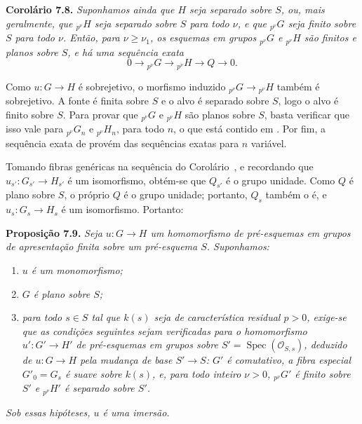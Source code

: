 \medskip
\noindent{}\textbf{Corolário 7.8.}
\textit{Suponhamos ainda que \(H\) seja separado sobre \(S\), ou, mais
geralmente, que \({}_{p^\nu}H\) seja separado sobre \(S\) para todo \(\nu\),
e que \({}_{p^\nu}G\) seja finito sobre \(S\) para todo \(\nu\). Então,
para \(\nu\geq\nu_1\), os esquemas em grupos \({}_{p^\nu}G\) e
\({}_{p^\nu}H\) são finitos e planos sobre \(S\), e há uma sequência
exata}
\[
  0\longrightarrow{}_{p^\nu}G
  \longrightarrow{}_{p^\nu}H
  \longrightarrow Q
  \longrightarrow0.
\]

Como \(u:G\to H\) é sobrejetivo, o morfismo induzido
\({}_{p^\nu}G\to{}_{p^\nu}H\) também é sobrejetivo. A fonte é finita
sobre \(S\) e o alvo é separado sobre \(S\), logo o alvo é
finito sobre \(S\). Para provar que \({}_{p^\nu}G\) e \({}_{p^\nu}H\) são
planos sobre \(S\), basta verificar que isso vale para
\({}_{p^\nu}G_n\) e \({}_{p^\nu}H_n\), para todo \(n\), o que está
contido em . Por fim, a sequência
exata de 
provém das sequências exatas  para
\(n\) variável.

Tomando fibras genéricas na sequência do
Corolário~, e recordando que
\(u_{s'}:G_{s'}\to H_{s'}\) é um isomorfismo, obtém-se que \(Q_{s'}\)
é o grupo unidade. Como \(Q\) é plano sobre \(S\), o próprio \(Q\) é o
grupo unidade; portanto, \(Q_s\) também o é, e \(u_s:G_s\to H_s\) é um
isomorfismo. Portanto:

\medskip
\noindent{}\textbf{Proposição 7.9.}
\textit{Seja \(u:G\to H\) um homomorfismo de pré-esquemas em grupos de
apresentação finita sobre um pré-esquema \(S\). Suponhamos:}
\begin{enumerate}
  \item[(a)]
  \textit{\(u\) é um monomorfismo;}
  \item[(b)]
  \textit{\(G\) é plano sobre \(S\);}
  \item[(c)]
  \textit{para todo \(s\in S\) tal que \(k(s)\) seja de característica
  residual \(p>0\), exige-se que as condições seguintes sejam verificadas
  para o homomorfismo \(u':G'\to H'\) de pré-esquemas em grupos sobre
  \(S'=\operatorname{Spec}(\mathscr O_{S,s})\), deduzido de
  \(u:G\to H\) pela mudança de base \(S'\to S\): \(G'\) é comutativo,
  a fibra especial \(G'_0=G_s\) é suave sobre \(k(s)\), e, para todo
  inteiro \(\nu>0\), \({}_{p^\nu}G'\) é finito sobre \(S'\) e
  \({}_{p^\nu}H'\) é separado sobre \(S'\).}
\end{enumerate}
\textit{Sob essas hipóteses, \(u\) é uma imersão.}

